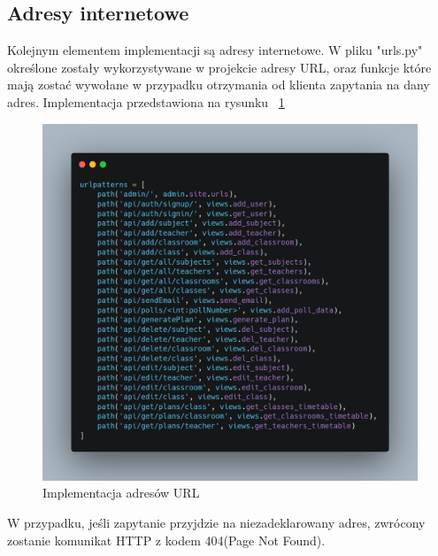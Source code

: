 \subsection{Adresy internetowe}
Kolejnym elementem implementacji są adresy internetowe. W pliku "urls.py" określone zostały wykorzystywane w projekcie adresy URL, oraz funkcje które mają zostać wywołane w przypadku otrzymania od klienta zapytania na dany adres. Implementacja przedstawiona na rysunku ~\ref{rys:URLs}
\begin{figure}[H]
 	\centering\includegraphics[width=\textwidth]{figures/Urls}
 	\caption{Implementacja adresów URL}\label{rys:URLs}
\end{figure}
W przypadku, jeśli zapytanie przyjdzie na niezadeklarowany adres, zwrócony zostanie komunikat HTTP z kodem 404(Page Not Found).


